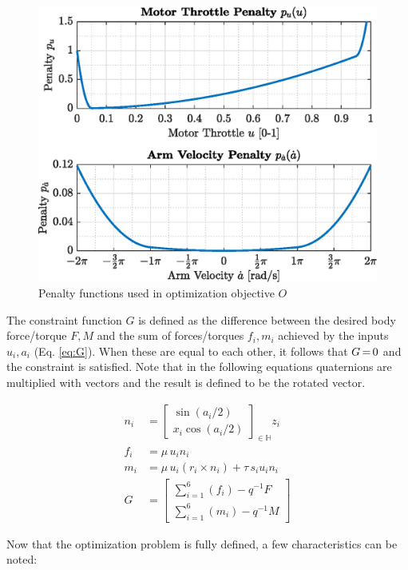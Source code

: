 \documentclass[conference]{IEEEtran}
\newcommand{\m}[1]{\begin{bmatrix}#1\end{bmatrix}}
\newcommand{\mcomp}{\thinmuskip=3mu\medmuskip=3mu\thickmuskip=3mu}
\begin{document}
\vspace{0pt}\par
\begin{figure}[h!]
	\includegraphics[width=\columnwidth]{img/3_sqp_penalty.eps}
	\centering
	\caption{Penalty functions used in optimization objective $O$}
	\label{fig:3_sqp_penalty}
\end{figure}
\par
The constraint function $G$ is defined as the difference between the desired body force/torque $F, M$ and the sum of forces/torques $f_i,m_i$ achieved by the inputs $u_i,a_i$ (Eq. \ref{eq:G}). When these are equal to each other, it follows that $\mcomp G=0$ and the constraint is satisfied. Note that in the following equations quaternions are multiplied with vectors and the result is defined to be the rotated vector.
\par
\begin{align}
	n_i &= \m{ \sin(a_i/2) \\ x_i \cos(a_i/2) }_{\in \mathbb{H}} z_i \\
	f_i &= \mu \, u_i n_i \\
	m_i &= \mu \, u_i (r_i \times n_i) + \tau \, s_i u_i n_i \\[10pt]
	G &= \m{ \sum_{i=1}^{6} (f_i) - q^{-1}F \\ \sum_{i=1}^{6} (m_i) - q^{-1}M }
	\label{eq:G}
\end{align}
\vspace{0pt}\par
Now that the optimization problem is fully defined, a few characteristics can be noted:
\end{document}
